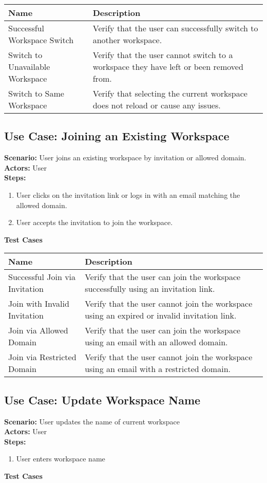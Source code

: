 \documentclass{article}
\begin{document}
            \begin{longtable}{|p{}|p{}|}
            \hline
            \textbf{Name} & \textbf{Description} \\
            \hline
            Successful Workspace Switch & Verify that the user can successfully switch to another workspace. \\
\hline
Switch to Unavailable Workspace & Verify that the user cannot switch to a workspace they have left or been removed from. \\
\hline
Switch to Same Workspace & Verify that selecting the current workspace does not reload or cause any issues. \\
\hline
\end{longtable}\subsection{\textbf{Use Case: Joining an Existing Workspace}}
\textbf{Scenario:} User joins an existing workspace by invitation or allowed domain.\\
\textbf{Actors:} User\\
\textbf{Steps:}
\begin{enumerate}
\item User clicks on the invitation link or logs in with an email matching the allowed domain.
\item User accepts the invitation to join the workspace.
\end{enumerate}
\textbf{Test Cases}

            \begin{longtable}{|p{}|p{}|}
            \hline
            \textbf{Name} & \textbf{Description} \\
            \hline
            Successful Join via Invitation & Verify that the user can join the workspace successfully using an invitation link. \\
\hline
Join with Invalid Invitation & Verify that the user cannot join the workspace using an expired or invalid invitation link. \\
\hline
Join via Allowed Domain & Verify that the user can join the workspace using an email with an allowed domain. \\
\hline
Join via Restricted Domain & Verify that the user cannot join the workspace using an email with a restricted domain. \\
\hline
\end{longtable}\subsection{\textbf{Use Case: Update Workspace Name}}
\textbf{Scenario:} User updates the name of current workspace\\
\textbf{Actors:} User\\
\textbf{Steps:}
\begin{enumerate}
\item User enters workspace name
\end{enumerate}
\textbf{Test Cases}
\end{document}
